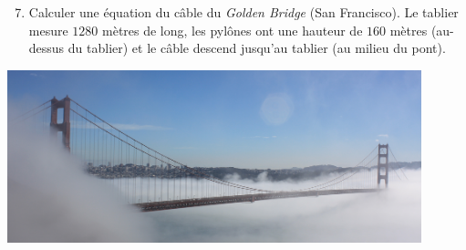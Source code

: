\begin{frame}



\begin{exercicecours}

\begin{enumerate}
 \setcounter{enumi}{6}


 \item Calculer une équation du câble du \emph{Golden Bridge} (San Francisco).
Le tablier mesure $1280$ mètres de long, les pylônes ont une hauteur de $160$ mètres (au-dessus
du tablier) et le câble descend jusqu'au tablier (au milieu du pont).

\vspace*{-1ex}
\shorthandoff{:}
\shorthandon{:}


\end{enumerate}

\end{exercicecours}

\begin{center}
\includegraphics[width=0.9\textwidth]{figures/Golden_Gate_Bridge_by_Mark_Gunn.jpg} 
\end{center}
\end{frame}




